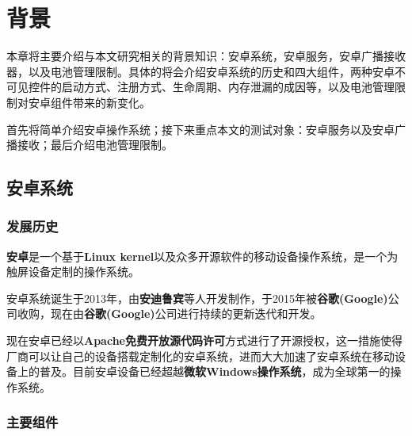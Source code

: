 \chapter{背景}\label{chapter_background}
本章将主要介绍与本文研究相关的背景知识：安卓系统，安卓服务，安卓广播接收器，以及电池管理限制。具体的将会介绍安卓系统的历史和四大组件，两种安卓不可见控件的启动方式、注册方式、生命周期、内存泄漏的成因等，以及电池管理限制对安卓组件带来的新变化。

首先将简单介绍安卓操作系统；接下来重点本文的测试对象：安卓服务以及安卓广播接收；最后介绍电池管理限制。

\section{安卓系统}
\subsection{发展历史}
\textbf{安卓}是一个基于\textbf{Linux kernel}以及众多开源软件的移动设备操作系统，是一个为触屏设备定制的操作系统。

安卓系统诞生于2013年，由\textbf{安迪鲁宾}等人开发制作，于2015年被\textbf{谷歌(Google)}公司收购，现在由\textbf{谷歌(Google)}公司进行持续的更新迭代和开发。

现在安卓已经以\textbf{Apache免费开放源代码许可}方式进行了开源授权，这一措施使得厂商可以让自己的设备搭载定制化的安卓系统，进而大大加速了安卓系统在移动设备上的普及。目前安卓设备已经超越\textbf{微软Windows操作系统}，成为全球第一的操作系统。

\subsection{主要组件}

